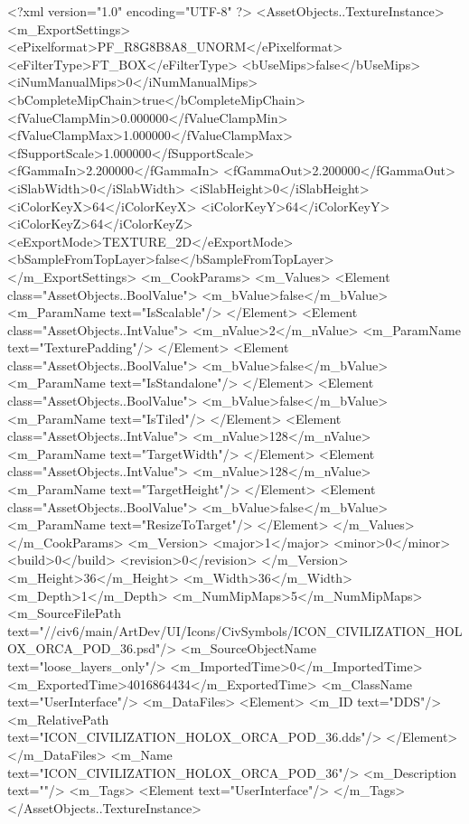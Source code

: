 <?xml version="1.0" encoding="UTF-8" ?>
<AssetObjects..TextureInstance>
	<m_ExportSettings>
		<ePixelformat>PF_R8G8B8A8_UNORM</ePixelformat>
		<eFilterType>FT_BOX</eFilterType>
		<bUseMips>false</bUseMips>
		<iNumManualMips>0</iNumManualMips>
		<bCompleteMipChain>true</bCompleteMipChain>
		<fValueClampMin>0.000000</fValueClampMin>
		<fValueClampMax>1.000000</fValueClampMax>
		<fSupportScale>1.000000</fSupportScale>
		<fGammaIn>2.200000</fGammaIn>
		<fGammaOut>2.200000</fGammaOut>
		<iSlabWidth>0</iSlabWidth>
		<iSlabHeight>0</iSlabHeight>
		<iColorKeyX>64</iColorKeyX>
		<iColorKeyY>64</iColorKeyY>
		<iColorKeyZ>64</iColorKeyZ>
		<eExportMode>TEXTURE_2D</eExportMode>
		<bSampleFromTopLayer>false</bSampleFromTopLayer>
	</m_ExportSettings>
	<m_CookParams>
		<m_Values>
			<Element class="AssetObjects..BoolValue">
				<m_bValue>false</m_bValue>
				<m_ParamName text="IsScalable"/>
			</Element>
			<Element class="AssetObjects..IntValue">
				<m_nValue>2</m_nValue>
				<m_ParamName text="TexturePadding"/>
			</Element>
			<Element class="AssetObjects..BoolValue">
				<m_bValue>false</m_bValue>
				<m_ParamName text="IsStandalone"/>
			</Element>
			<Element class="AssetObjects..BoolValue">
				<m_bValue>false</m_bValue>
				<m_ParamName text="IsTiled"/>
			</Element>
			<Element class="AssetObjects..IntValue">
				<m_nValue>128</m_nValue>
				<m_ParamName text="TargetWidth"/>
			</Element>
			<Element class="AssetObjects..IntValue">
				<m_nValue>128</m_nValue>
				<m_ParamName text="TargetHeight"/>
			</Element>
			<Element class="AssetObjects..BoolValue">
				<m_bValue>false</m_bValue>
				<m_ParamName text="ResizeToTarget"/>
			</Element>
		</m_Values>
	</m_CookParams>
	<m_Version>
		<major>1</major>
		<minor>0</minor>
		<build>0</build>
		<revision>0</revision>
	</m_Version>
	<m_Height>36</m_Height>
	<m_Width>36</m_Width>
	<m_Depth>1</m_Depth>
	<m_NumMipMaps>5</m_NumMipMaps>
	<m_SourceFilePath text="//civ6/main/ArtDev/UI/Icons/CivSymbols/ICON_CIVILIZATION_HOLOX_ORCA_POD_36.psd"/>
	<m_SourceObjectName text="loose_layers_only"/>
	<m_ImportedTime>0</m_ImportedTime>
	<m_ExportedTime>4016864434</m_ExportedTime>
	<m_ClassName text="UserInterface"/>
	<m_DataFiles>
		<Element>
			<m_ID text="DDS"/>
			<m_RelativePath text="ICON_CIVILIZATION_HOLOX_ORCA_POD_36.dds"/>
		</Element>
	</m_DataFiles>
	<m_Name text="ICON_CIVILIZATION_HOLOX_ORCA_POD_36"/>
	<m_Description text=""/>
	<m_Tags>
		<Element text="UserInterface"/>
	</m_Tags>
</AssetObjects..TextureInstance>


